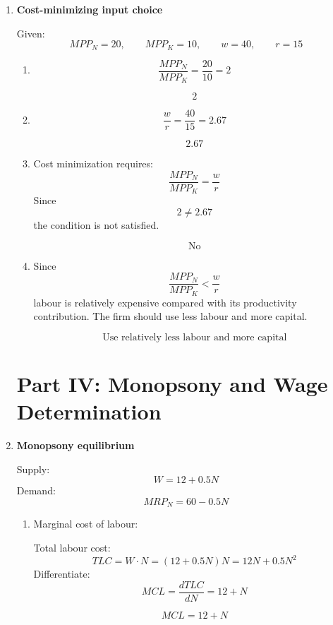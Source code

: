 \documentclass[12pt]{article}
\begin{document}
\begin{enumerate}

\item \textbf{Cost-minimizing input choice}

Given:
\[
MPP_N=20,\qquad MPP_K=10,\qquad w=40,\qquad r=15
\]

\begin{enumerate}[label=(\alph*)]
    \item 
    \[
    \frac{MPP_N}{MPP_K}=\frac{20}{10}=2
    \]

    \[
    \boxed{2}
    \]

    \item
    \[
    \frac{w}{r}=\frac{40}{15}=2.67
    \]

    \[
    \boxed{2.67}
    \]

    \item Cost minimization requires:
    \[
    \frac{MPP_N}{MPP_K}=\frac{w}{r}
    \]
    Since
    \[
    2 \neq 2.67
    \]
    the condition is not satisfied.

    \[
    \boxed{\text{No}}
    \]

    \item Since
    \[
    \frac{MPP_N}{MPP_K}<\frac{w}{r}
    \]
    labour is relatively expensive compared with its productivity contribution. The firm should use less labour and more capital.

    \[
    \boxed{\text{Use relatively less labour and more capital}}
    \]
\end{enumerate}

\section*{Part IV: Monopsony and Wage Determination}

\item \textbf{Monopsony equilibrium}

Supply:
\[
W=12+0.5N
\]
Demand:
\[
MRP_N=60-0.5N
\]

\begin{enumerate}[label=(\alph*)]
    \item Marginal cost of labour:

    Total labour cost:
    \[
    TLC=W\cdot N=(12+0.5N)N=12N+0.5N^2
    \]
    Differentiate:
    \[
    MCL=\frac{dTLC}{dN}=12+N
    \]

    \[
    \boxed{MCL=12+N}
    \]


\end{enumerate}
\end{enumerate}
\end{document}
